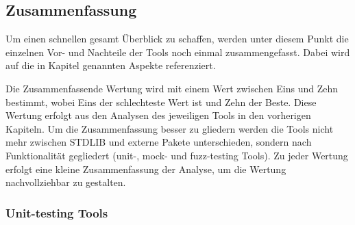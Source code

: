 \subsection{Zusammenfassung}\label{zusammenfassung}

Um einen schnellen gesamt Überblick zu schaffen, werden unter diesem Punkt die
einzelnen Vor- und Nachteile der Tools noch einmal zusammengefasst. Dabei wird
auf die in Kapitel  genannten Aspekte referenziert.

Die Zusammenfassende Wertung wird mit einem Wert zwischen Eins und Zehn
bestimmt, wobei Eins der schlechteste Wert ist und Zehn der Beste. Diese Wertung
erfolgt aus den Analysen des jeweiligen Tools in den vorherigen Kapiteln. Um die
Zusammenfassung besser zu gliedern werden die Tools nicht mehr zwischen STDLIB
und externe Pakete unterschieden, sondern nach Funktionalität gegliedert (unit-,
mock- und fuzz-testing Tools). Zu jeder Wertung erfolgt eine kleine
Zusammenfassung der Analyse, um die Wertung nachvollziehbar zu gestalten.

\subsubsection{Unit-testing Tools}\label{zusammenfassung:unit}

